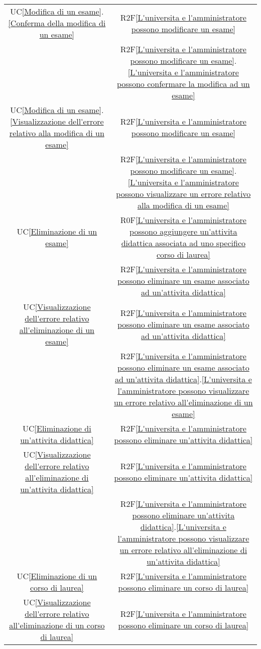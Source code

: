 \begin{longtable}{|c|c|}
\hline
UC\ref{Modifica di un esame}.\ref{Conferma della modifica di un esame} & R2F\ref{L'universita e l'amministratore possono modificare un esame}\\
& R2F\ref{L'universita e l'amministratore possono modificare un esame}.\ref{L'universita e l'amministratore possono confermare la modifica ad un esame}\\
\hline
UC\ref{Modifica di un esame}.\ref{Visualizzazione dell'errore relativo alla modifica di un esame} & R2F\ref{L'universita e l'amministratore possono modificare un esame}\\
& R2F\ref{L'universita e l'amministratore possono modificare un esame}.\ref{L'universita e l'amministratore possono visualizzare un errore relativo alla modifica di un esame}\\
\hline
UC\ref{Eliminazione di un esame} & R0F\ref{L'universita e l'amministratore possono aggiungere un'attivita didattica associata ad uno specifico corso di laurea}\\
& R2F\ref{L'universita e l'amministratore possono eliminare un esame associato ad un'attivita didattica}\\
\hline
UC\ref{Visualizzazione dell'errore relativo all'eliminazione di un esame} & R2F\ref{L'universita e l'amministratore possono eliminare un esame associato ad un'attivita didattica}\\
& R2F\ref{L'universita e l'amministratore possono eliminare un esame associato ad un'attivita didattica}.\ref{L'universita e l'amministratore possono visualizzare un errore relativo all'eliminazione di un esame}\\
\hline
UC\ref{Eliminazione di un'attivita didattica} & R2F\ref{L'universita e l'amministratore possono eliminare un'attivita didattica}\\
\hline
UC\ref{Visualizzazione dell'errore relativo all'eliminazione di un'attivita didattica} & R2F\ref{L'universita e l'amministratore possono eliminare un'attivita didattica}\\
& R2F\ref{L'universita e l'amministratore possono eliminare un'attivita didattica}.\ref{L'universita e l'amministratore possono visualizzare un errore relativo all'eliminazione di un'attivita didattica}\\
\hline
UC\ref{Eliminazione di un corso di laurea} & R2F\ref{L'universita e l'amministratore possono eliminare un corso di laurea}\\
\hline
UC\ref{Visualizzazione dell'errore relativo all'eliminazione di un corso di laurea} & R2F\ref{L'universita e l'amministratore possono eliminare un corso di laurea}\\

\end{longtable}

